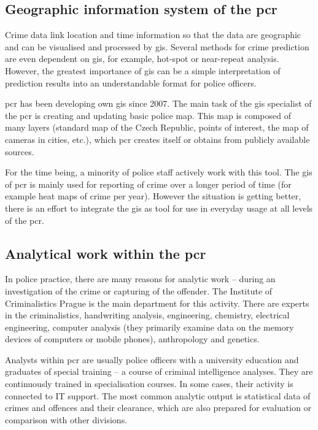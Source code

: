 \documentclass[thesis=M,english]{FITthesis}[2012/10/20]
\begin{document}
\subsection{Geographic information system of the \gls{pcr}}

Crime data link location and time information so that the data are geographic and can be visualised and processed by \gls{gis}. Several methods for crime prediction are even dependent on \gls{gis}, for example, hot-spot or near-repeat analysis. However, the greatest importance of \gls{gis} can be a simple interpretation of prediction results into an understandable format for police officers. 

\gls{pcr} has been developing own \gls{gis} since 2007. \cite[101]{Hruska2015maps} The main task of the \gls{gis} specialist of the \gls{pcr} is creating and updating basic police map. This map is composed of many layers (standard map of the Czech Republic, points of interest, the map of cameras in cities, etc.), which \gls{pcr} creates itself or obtains from publicly available sources. 

For the time being, a minority of police staff actively work with this tool. The \gls{gis} of \gls{pcr} is mainly used for reporting of crime over a longer period of time (for example heat maps of crime per year). However the situation is getting better, there is an effort to integrate the \gls{gis} as tool for use in everyday usage at all levels of the \gls{pcr}.\cite[103]{Hruska2015maps}

\subsection{Analytical work within the \gls{pcr}}

In police practice, there are many reasons for analytic work -- during an investigation of the crime or capturing of the offender. The Institute of Criminalistics Prague is the main department for this activity. There are experts in the criminalistics, handwriting analysis, engineering, chemistry, electrical engineering, computer analysis (they primarily examine data on the memory devices of computers or mobile phones), anthropology and genetics.\cite[59]{Vokous2010pcr}

Analysts within \gls{pcr} are usually police officers with a university education and graduates of special training -- a course of criminal intelligence analyses. They are continuously trained in specialisation courses. In some cases, their activity is connected to IT support. The most common analytic output is statistical data of crimes and offences and their clearance, which are also prepared for evaluation or comparison with other divisions.\cite[99]{Hruska2015maps}
\end{document}
